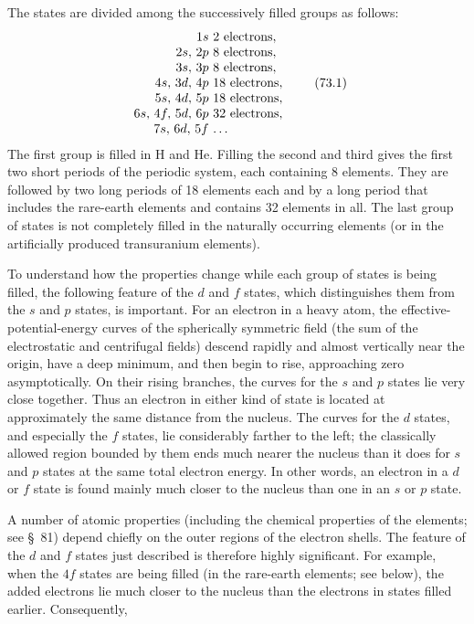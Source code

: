 The states are divided among the successively filled groups as follows:
\begin{equation}
\begin{array}{r@{\ }l}
1s&2\text{ electrons},\\
2s,\,2p&8\text{ electrons},\\
3s,\,3p&8\text{ electrons},\\
4s,\,3d,\,4p&18\text{ electrons},\\
5s,\,4d,\,5p&18\text{ electrons},\\
6s,\,4f,\,5d,\,6p&32\text{ electrons},\\
7s,\,6d,\,5f&\ldots
\end{array}
\tag{73.1}
\end{equation}
The first group is filled in H and He. Filling the second and third gives the first two short periods of the periodic system, each containing 8 elements. They are followed by two long periods of 18 elements each and by a long period that includes the rare-earth elements and contains 32 elements in all. The last group of states is not completely filled in the naturally occurring elements (or in the artificially produced transuranium elements).

To understand how the properties change while each group of states is being filled, the following feature of the $d$ and $f$ states, which distinguishes them from the $s$ and $p$ states, is important. For an electron in a heavy atom, the effective-potential-energy curves of the spherically symmetric field (the sum of the electrostatic and centrifugal fields) descend rapidly and almost vertically near the origin, have a deep minimum, and then begin to rise, approaching zero asymptotically. On their rising branches, the curves for the $s$ and $p$ states lie very close together. Thus an electron in either kind of state is located at approximately the same distance from the nucleus. The curves for the $d$ states, and especially the $f$ states, lie considerably farther to the left; the classically allowed region bounded by them ends much nearer the nucleus than it does for $s$ and $p$ states at the same total electron energy. In other words, an electron in a $d$ or $f$ state is found mainly much closer to the nucleus than one in an $s$ or $p$ state.

A number of atomic properties (including the chemical properties of the elements; see \S~81) depend chiefly on the outer regions of the electron shells. The feature of the $d$ and $f$ states just described is therefore highly significant. For example, when the $4f$ states are being filled (in the rare-earth elements; see below), the added electrons lie much closer to the nucleus than the electrons in states filled earlier. Consequently,


